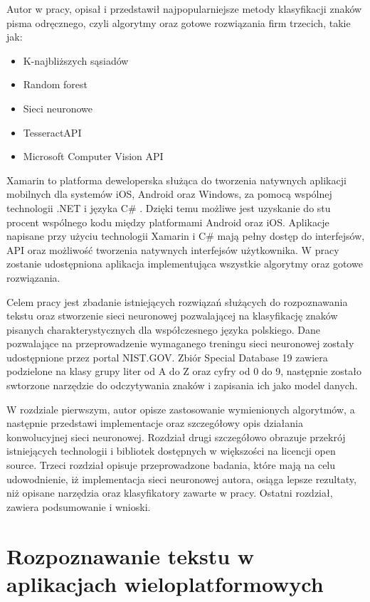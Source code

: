 \documentclass[brudnopis]{xmgr}
\begin{document}
	Autor w pracy, opisał i przedstawił najpopularniejsze metody klasyfikacji znaków pisma odręcznego, czyli algorytmy oraz gotowe rozwiązania firm trzecich, takie jak:
\begin{itemize}
\item
K-najbliższych sąsiadów
\item
Random forest
\item
Sieci neuronowe
\item
TesseractAPI
\item
Microsoft Computer Vision API
\end{itemize}
\newpage

	Xamarin to platforma deweloperska służąca do tworzenia natywnych aplikacji mobilnych dla systemów iOS, Android oraz Windows, za pomocą wspólnej technologii .NET i języka C\# . Dzięki temu możliwe jest uzyskanie do stu procent wspólnego kodu między platformami Android oraz iOS. Aplikacje napisane przy użyciu technologii Xamarin i C\# mają pełny dostęp do interfejsów, API oraz możliwość tworzenia natywnych interfejsów użytkownika. W pracy zostanie udostępniona aplikacja implementująca wszystkie algorytmy oraz gotowe rozwiązania.
  
  Celem pracy jest  zbadanie istniejących rozwiązań służących do rozpoznawania tekstu oraz stworzenie sieci neuronowej pozwalającej na klasyfikację znaków pisanych charakterystycznych dla współczesnego języka polskiego. Dane pozwalające na przeprowadzenie wymaganego treningu sieci neuronowej zostały udostępnione przez portal NIST.GOV. Zbiór Special Database 19 zawiera podzielone na klasy grupy liter od A do Z oraz cyfry od 0 do 9, następnie zostało swtorzone narzędzie do odczytywania znaków i zapisania ich jako model danych.
  
  W rozdziale pierwszym, autor opisze zastosowanie wymienionych algorytmów, a następnie przedstawi implementacje oraz szczegółowy opis działania konwolucyjnej sieci neuronowej. Rozdział drugi szczegółowo obrazuje przekrój istniejących technologii i bibliotek dostępnych w większości na licencji open source. Trzeci rozdział opisuje przeprowadzone badania, które mają na celu udowodnienie, iż implementacja sieci neuronowej autora, osiąga lepsze rezultaty, niż opisane narzędzia oraz klasyfikatory zawarte w pracy. Ostatni rozdział, zawiera podsumowanie i wnioski.

\chapter{Rozpoznawanie tekstu w aplikacjach wieloplatformowych}
\end{document}
